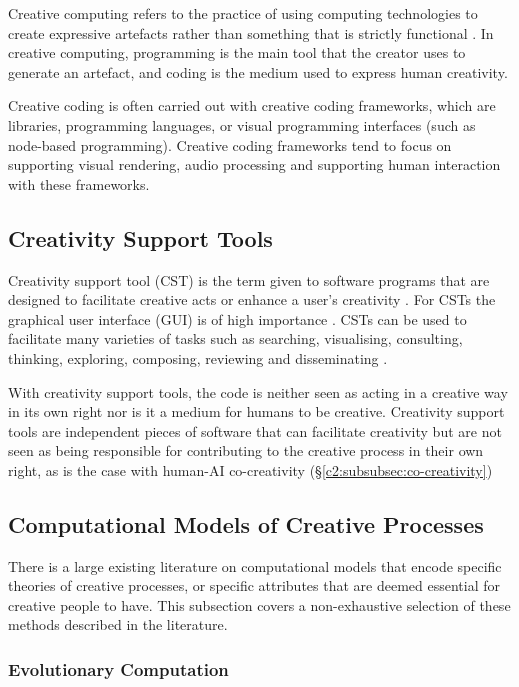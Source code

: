 Creative computing refers to the practice of using computing technologies to create expressive artefacts rather than something that is strictly functional \citep{yang2016promoting}.
In creative computing, programming is the main tool that the creator uses to generate an artefact, and coding is the medium used to express human creativity. 

Creative coding is often carried out with creative coding frameworks, which are libraries, programming languages, or visual programming interfaces (such as node-based programming). 
Creative coding frameworks tend to focus on supporting visual rendering, audio processing and supporting human interaction with these frameworks. 


\subsection{Creativity Support Tools}
\label{c2:subsec:cst}

Creativity support tool (CST) is the term given to software programs that are designed to facilitate creative acts or enhance a user's creativity \citep{shneiderman2002creativity}. 
For CSTs the graphical user interface (GUI) is of high importance \citep{shneiderman1999user}. 
CSTs can be used to facilitate many varieties of tasks such as searching, visualising, consulting, thinking, exploring, composing, reviewing and disseminating \citep{shneiderman2002cst_tutorial}.

With creativity support tools, the code is neither seen as acting in a creative way in its own right nor is it a medium for humans to be creative. 
Creativity support tools are independent pieces of software that can facilitate creativity but are not seen as being responsible for contributing to the creative process in their own right, as is the case with human-AI co-creativity (\S \ref{c2:subsubsec:co-creativity})

\subsection{Computational Models of Creative Processes}

There is a large existing literature on computational models that encode specific theories of creative processes, or specific attributes that are deemed essential for creative people to have.
This subsection covers a non-exhaustive selection of these methods described in the literature.

\subsubsection{Evolutionary Computation}

